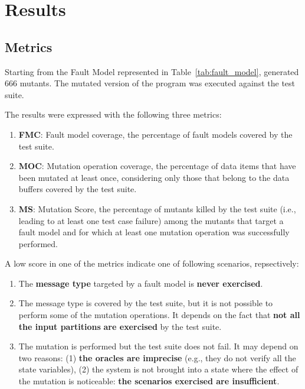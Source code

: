 
\chapter{Results}

\section{Metrics}

Starting from the Fault Model represented in Table~\ref{tab:fault_model}, \DAMA generated 666 mutants. The mutated version of the program was executed against the \case test suite.

The results were expressed with the following three metrics:
\begin{enumerate}
\item \textbf{FMC}: Fault model coverage, the percentage of fault models covered by the test suite.
\item \textbf{MOC}: Mutation operation coverage, the percentage of data items that have been mutated at least once, considering only those that belong to the data buffers covered by the test suite.
\item \textbf{MS}: Mutation Score, the percentage of mutants killed by the test suite (i.e., leading to at least one test case failure) among the mutants that target a fault model and for which at least one mutation operation was successfully performed.
\end{enumerate}


A low score in one of the metrics indicate one of following scenarios, repsectively:
\begin{enumerate}
\item The \textbf{message type} targeted by a fault model is \textbf{never exercised}.
\item The message type is covered by the test suite, but it is not possible to perform some of the mutation operations. It depends on the fact that \textbf{not all the input partitions} \textbf{are exercised} by the test suite.
\item The mutation is performed but the test suite does not fail. It may depend on two reasons: (1) \textbf{the oracles are imprecise} (e.g., they do not verify all the state variables), (2) the system is not brought into a state where the effect of the mutation is noticeable: \textbf{the scenarios exercised are insufficient}.
\end{enumerate}

